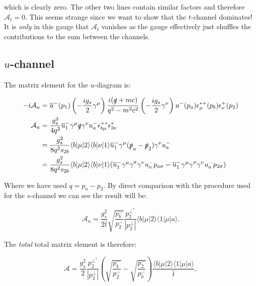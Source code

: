 			which is clearly zero.  The other two lines contain similar factors and therefore $\mathcal{A}_t=0$.
			This seems strange since we want to show that the $t$-channel dominates!  It is \emph{only} in this
			gauge that $\mathcal{A}_t$ vanishes as the gauge effectively just shuffles the contributions to the
			sum between the channels.

		\subsection{$u$-channel}

			The matrix element for the $u$-diagram is:

			\begin{equation}
			\begin{split}
			-i\mathcal{A}_u &= \overline{u}^-(p_1)\left(-\frac{ig_s}{2}\gamma^\mu\right)\frac{i(\slashed q+mc)}{q^2-m^2c^2}\left(-\frac{ig_s}{2}\gamma^\nu\right)u^-(p_a)\epsilon_\mu^{*+}(p_b)\epsilon^+_\nu(p_2)\\
			\mathcal{A}_u &= \frac{g_s^2}{4q^2}\overline{u}^-_1\gamma^\mu\slashed q\gamma^\nu u^-_a\epsilon^{+*}_{b\mu}\epsilon^*_{2\nu}\\
			&= \frac{g_s^2}{8q^2s_{2b}}\langle b|\mu|2\rangle\langle b|\nu|1\rangle\overline{u}^-_1\gamma^\mu(\slashed{p}_a-\slashed{p}_2)\gamma^\nu u^-_a\\
			&= \frac{g_s^2}{8q^2s_{2b}}\langle b|\mu|2\rangle\langle b|\nu|1\rangle(\overline{u}^-_1\gamma^\mu\gamma^\sigma\gamma^\nu u^-_ap_{a\sigma} - \overline{u}^-_1\gamma^\mu\gamma^\sigma \gamma^\nu u^-_ap_{2\sigma})
			\end{split}
			\end{equation}

			Where we have used $q=p_a-p_2$.  By direct comparison with the procedure used for the $s$-channel we can see the result will be:

			\begin{equation}
			\mathcal{A}_u=\frac{g_s^2}{2\hat{t}}\sqrt{\frac{p_b^-}{p_2^-}}\frac{p_2^{\perp^*}}{|p_2^\perp|}\langle{b}|\mu|2\rangle\langle{1}|\mu|a\rangle.
			\end{equation}

			The \emph{total} total matrix element is therefore:

			\begin{equation}
			\mathcal{A}=\frac{g_s^2}{2}\frac{p_2^{\perp^*}}{|p_2^\perp|}\left(\sqrt{\frac{p_b^-}{p_2^-}}-\sqrt{\frac{p_2^-}{p_b^-}}\right)\frac{\langle{b}|\mu|2\rangle\langle{1}|\mu|a\rangle}{\hat{t}},
			\label{eqn:fullsum}
			\end{equation}

